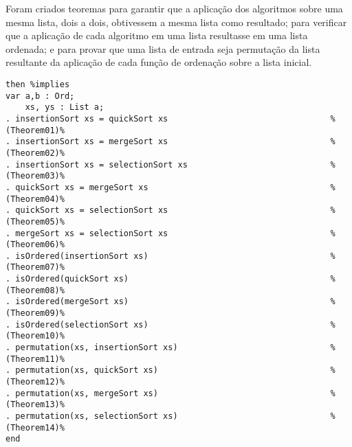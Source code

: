 Foram criados teoremas para garantir que a aplicação dos algoritmos sobre uma mesma lista, dois a dois, obtivessem a mesma lista como resultado;
para verificar que a aplicação de cada algoritmo em uma lista resultasse em uma lista ordenada;
e para provar que uma lista de entrada seja permutação da lista resultante da aplicação de cada função de ordenação sobre a lista inicial.

\begin{Verbatim}
then %implies                                       
var a,b : Ord;                                      
    xs, ys : List a;                                
. insertionSort xs = quickSort xs                                 %(Theorem01)%
. insertionSort xs = mergeSort xs                                 %(Theorem02)%
. insertionSort xs = selectionSort xs                             %(Theorem03)%
. quickSort xs = mergeSort xs                                     %(Theorem04)%
. quickSort xs = selectionSort xs                                 %(Theorem05)%
. mergeSort xs = selectionSort xs                                 %(Theorem06)%
. isOrdered(insertionSort xs)                                     %(Theorem07)%
. isOrdered(quickSort xs)                                         %(Theorem08)%
. isOrdered(mergeSort xs)                                         %(Theorem09)%
. isOrdered(selectionSort xs)                                     %(Theorem10)%
. permutation(xs, insertionSort xs)                               %(Theorem11)%
. permutation(xs, quickSort xs)                                   %(Theorem12)%
. permutation(xs, mergeSort xs)                                   %(Theorem13)%
. permutation(xs, selectionSort xs)                               %(Theorem14)%
end
\end{Verbatim}
